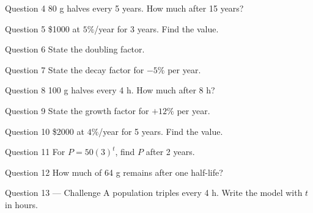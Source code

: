 \documentclass[11pt]{article}
\begin{document}
\begin{qbox}{Question 4}
80 g halves every 5 years. How much after 15 years?\workspace{2.4cm}
\end{qbox}

\begin{qbox}{Question 5}
\$1000 at $5\%$/year for 3 years. Find the value.\workspace{2.4cm}
\end{qbox}

\begin{qbox}{Question 6}
State the doubling factor.\workspace{2.4cm}
\end{qbox}

\begin{qbox}{Question 7}
State the decay factor for $-5\%$ per year.\workspace{2.4cm}
\end{qbox}

\begin{qbox}{Question 8}
100 g halves every 4 h. How much after 8 h?\workspace{2.4cm}
\end{qbox}

\begin{qbox}{Question 9}
State the growth factor for $+12\%$ per year.\workspace{2.4cm}
\end{qbox}

\begin{qbox}{Question 10}
\$2000 at $4\%$/year for 5 years. Find the value.\workspace{2.4cm}
\end{qbox}

\begin{qbox}{Question 11}
For $P=50(3)^t$, find $P$ after 2 years.\workspace{2.4cm}
\end{qbox}

\begin{qbox}{Question 12}
How much of 64 g remains after one half-life?\workspace{2.4cm}
\end{qbox}

\begin{qbox}{Question 13 --- Challenge}
A population triples every 4 h. Write the model with $t$ in hours.\workspace{3cm}
\end{qbox}

\clearpage
{}
\end{document}
